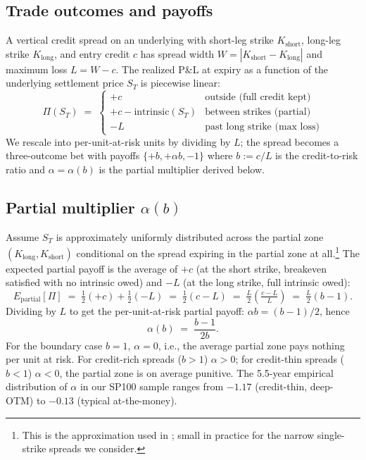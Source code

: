 \documentclass[11pt]{article}
\theoremstyle{definition}
\theoremstyle{remark}
\begin{document}
\subsection{Trade outcomes and payoffs}

A vertical credit spread on an underlying with short-leg strike
$K_{\text{short}}$, long-leg strike $K_{\text{long}}$, and entry credit
$c$ has spread width $W = |K_{\text{short}} - K_{\text{long}}|$ and
maximum loss $L = W - c$. The realized P\&L at expiry as a function of
the underlying settlement price $S_T$ is piecewise linear:
\begin{equation}
\Pi(S_T) \;=\;
\begin{cases}
+c & \text{outside (full credit kept)}\\[2pt]
+c - \mathrm{intrinsic}(S_T) & \text{between strikes (partial)}\\[2pt]
-L & \text{past long strike (max loss)}
\end{cases}
\end{equation}
We rescale into per-unit-at-risk units by dividing by $L$; the spread
becomes a three-outcome bet with payoffs $\{+b, +\alpha b, -1\}$ where
$b := c / L$ is the credit-to-risk ratio and $\alpha = \alpha(b)$ is
the partial multiplier derived below.

\subsection{Partial multiplier $\alpha(b)$}

Assume $S_T$ is approximately uniformly distributed across the partial
zone $(K_{\text{long}}, K_{\text{short}})$ conditional on the spread
expiring in the partial zone at all.\footnote{This is the approximation
used in \citet{mercurio2020}; small in practice for the narrow
single-strike spreads we consider.} The expected partial payoff is the
average of $+c$ (at the short strike, breakeven satisfied with no
intrinsic owed) and $-L$ (at the long strike, full intrinsic owed):
\begin{equation}
E_{\mathrm{partial}}[\Pi] \;=\; \tfrac{1}{2}(+c) + \tfrac{1}{2}(-L)
\;=\; \tfrac{1}{2}(c - L)
\;=\; \tfrac{L}{2}\!\left(\tfrac{c-L}{L}\right)
\;=\; \tfrac{L}{2}(b - 1).
\end{equation}
Dividing by $L$ to get the per-unit-at-risk partial payoff:
$\alpha b = (b - 1)/2$, hence
\begin{equation}
\alpha(b) \;=\; \frac{b - 1}{2b}.
\end{equation}
For the boundary case $b = 1$, $\alpha = 0$, i.e., the average partial
zone pays nothing per unit at risk. For credit-rich spreads ($b > 1$)
$\alpha > 0$; for credit-thin spreads ($b < 1$) $\alpha < 0$, the
partial zone is on average punitive. The 5.5-year empirical
distribution of $\alpha$ in our SP100 sample ranges from $-1.17$
(credit-thin, deep-OTM) to $-0.13$ (typical at-the-money).
\end{document}

